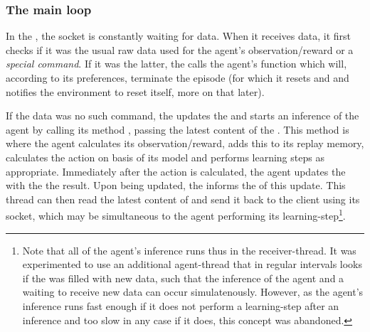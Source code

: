 \subsubsection{The main loop}

In the , the socket is constantly waiting for data. When it receives data, it first checks if it was the usual raw data used for the agent's observation/reward or a \textit{special command}. If it was the latter, the  calls the agent's function  which will, according to its preferences, terminate the episode (for which it resets  and  and notifies the environment to reset itself, more on that later). 

If the data was no such command, the  updates the  and starts an inference of the agent by calling its method , passing the latest content of the . This method is where the agent calculates its observation/reward, adds this to its replay memory, calculates the action on basis of its model and performs learning steps as appropriate. Immediately after the action is calculated, the agent updates the  with the the result. Upon being updated, the  informs the  of this update. This thread can then read the latest content of  and send it back to the client using its socket, which may be simultaneous to the agent performing its learning-step\footnote{Note that all of the agent's inference runs thus in the receiver-thread. It was experimented to use an additional agent-thread that in regular intervals looks if the  was filled with new data, such that the inference of the agent and a waiting to receive new data can occur simulatenously. However, as the agent's inference runs fast enough if it does not perform a learning-step after an inference and too slow in any case if it does, this concept was abandoned.}. 

